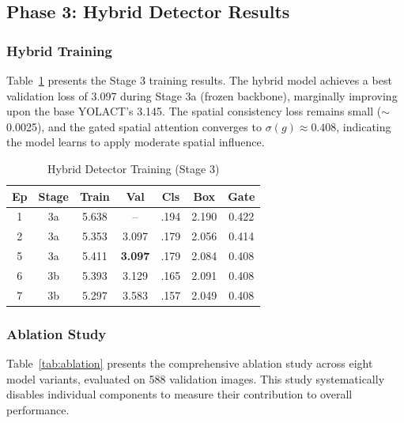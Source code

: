 \documentclass[conference]{IEEEtran}
\begin{document}
\subsection{Phase 3: Hybrid Detector Results}

\subsubsection{Hybrid Training}

Table~\ref{tab:hybrid_training} presents the Stage 3 training results. The
hybrid model achieves a best validation loss of 3.097 during Stage 3a
(frozen backbone), marginally improving upon the base YOLACT's 3.145. The
spatial consistency loss remains small ($\sim$0.0025), and the gated spatial
attention converges to $\sigma(g) \approx 0.408$, indicating the model learns
to apply moderate spatial influence.

\begin{table}[t]
  \centering
  \caption{Hybrid Detector Training (Stage 3)}
  \label{tab:hybrid_training}
  \begin{tabular}{ccccccc}
    \toprule
    \textbf{Ep} & \textbf{Stage} & \textbf{Train} & \textbf{Val} &
    \textbf{Cls} & \textbf{Box} & \textbf{Gate} \\
    \midrule
    1 & 3a & 5.638 & --    & .194 & 2.190 & 0.422 \\
    2 & 3a & 5.353 & 3.097 & .179 & 2.056 & 0.414 \\
    5 & 3a & 5.411 & \textbf{3.097} & .179 & 2.084 & 0.408 \\
    6 & 3b & 5.393 & 3.129 & .165 & 2.091 & 0.408 \\
    7 & 3b & 5.297 & 3.583 & .157 & 2.049 & 0.408 \\
    \bottomrule
  \end{tabular}
\end{table}

\subsubsection{Ablation Study}

Table~\ref{tab:ablation} presents the comprehensive ablation study across
eight model variants, evaluated on 588 validation images. This study
systematically disables individual components to measure their contribution
to overall performance.
\end{document}
